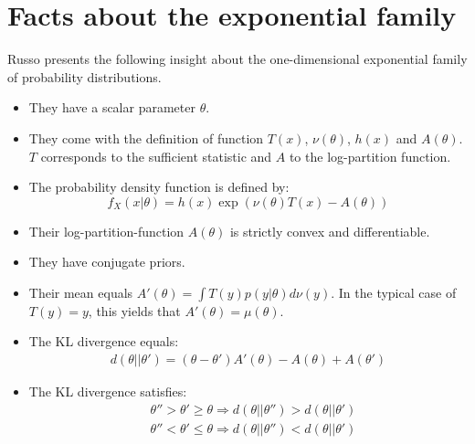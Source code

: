 \section{Facts about the exponential family}
Russo presents the following insight about the one-dimensional exponential family of probability distributions.
\begin{itemize}
  \item They have a scalar parameter $\theta$.
  \item They come with the definition of function $T(x)$, $\nu(\theta)$, $h(x)$ and $A(\theta)$. $T$ corresponds to the sufficient statistic and $A$ to the log-partition function.
  \item The probability density function is defined by:
    \[f_X(x|\theta) = h(x) \exp(\nu(\theta) T(x) - A(\theta))\]
  \item Their log-partition-function $A(\theta)$ is strictly convex and differentiable.
  \item They have conjugate priors.
  \item Their mean equals $A'(\theta) = \int T(y)p(y|\theta)d\nu(y)$. In the typical case of $T(y)=y$, this yields that $A'(\theta) = \mu(\theta)$.
  \item The KL divergence equals:
    \begin{align}
        d(\theta||\theta') = (\theta - \theta')A'(\theta) - A(\theta) + A(\theta')\label{eq:exponential_kl}
    \end{align}
  \item The KL divergence satisfies:
    \begin{align}
      &\theta'' > \theta' \geq \theta \Rightarrow d(\theta||\theta'') > d(\theta||\theta') \label{eq:kl_monotonicity}\\
      &\theta'' < \theta' \leq \theta \Rightarrow d(\theta||\theta'') < d(\theta||\theta')
    \end{align}
\end{itemize}


